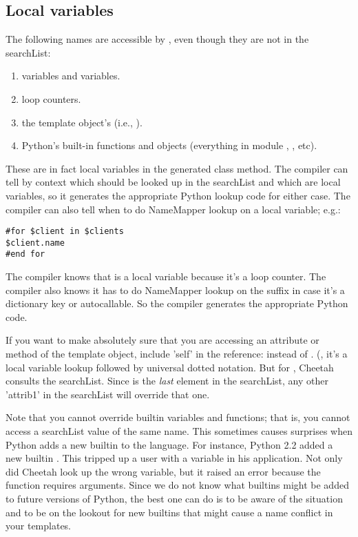 \subsection{Local variables}
\label{language.localVariables}

The following names are accessible by , even though they
are not in the searchList:  

\begin{enumerate}
\item {} variables and  variables.
\item {} loop counters.
\item the template object's  (i.e., ).
\item Python's built-in functions and objects (everything in module
     , , etc).
\end{enumerate}

These are in fact local variables in the generated class method.  The compiler
can tell by context which  should be looked up in the
searchList and which are local variables, so it generates the appropriate
Python lookup code for either case.  The compiler can also tell when to do
NameMapper lookup on a local variable; e.g.:
\begin{verbatim}
#for $client in $clients 
$client.name
#end for
\end{verbatim}
The compiler knows that  is a local variable because it's a
 loop counter.  The compiler also knows it has to do NameMapper
lookup on the  suffix in case it's a dictionary key or 
autocallable.  So the compiler generates the appropriate Python code.

If you want to make absolutely sure that you are accessing an attribute or
method of the template object, include 'self' in the reference:
 instead of .  (, it's
a local variable lookup followed by universal dotted notation.  But for
, Cheetah consults the searchList.  Since  is the
{\em last} element in the searchList, any other 'attrib1' in the searchList
will override that one.

Note that you cannot override builtin variables and functions; that is, you
cannot access a searchList value of the same name.  This sometimes causes
surprises when Python adds a new builtin to the language.  For instance, Python
2.2 added a new builtin .  This tripped up a user with a 
 variable in his application.  Not only did Cheetah look up
the wrong variable, but it raised an error because the  function
requires arguments.  Since we do not know what builtins might be added to future
versions of Python, the best one can do is to be aware of the situation and to
be on the lookout for new builtins that might cause a name conflict in your
templates.

